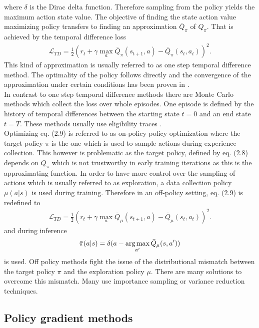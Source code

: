 where $\delta$ is the Dirac delta function. Therefore sampling from the policy yields the maximum action state value. The objective of finding the state action value maximizing policy transfers to finding an approximation $\bar{Q}_{\pi}$ of $Q_{\pi}$. That is achieved by the temporal difference loss
\begin{align}
\mathcal{L}_{TD} = \frac{1}{2} \left(r_{t} + \gamma \max_{a}\bar{Q}_{\pi}(s_{t+1}, a) - \bar{Q}_{\pi}(s_t, a_t)\right)^2.
\end{align}
This kind of approximation is usually referred to as one step temporal difference method. The optimality of the policy follows directly and the convergence of the approximation under certain conditions has been proven in \cite{SBQL}.\\
In contrast to one step temporal difference methods there are Monte Carlo methods which collect the loss over whole episodes. One episode is defined by the history of temporal differences between the starting state $t=0$ and an end state $t=T$. These methods usually use eligibility traces \cite{SBeligibility}. \\
Optimizing eq. (2.9) is referred to as on-policy policy optimization where the target policy $\pi$ is the one which is used to sample actions during experience collection. This however is problematic as the target policy, defined by eq. (2.8) depends on $Q_{\pi}$ which is not trustworthy in early training iterations as this is the approximating function. In order to have more control over the sampling of actions which is usually referred to as exploration, a data collection policy $\mu(a|s)$ is used during training. Therefore in an off-policy setting, eq. (2.9) is redefined to
\begin{align}
\mathcal{L}_{TD} = \frac{1}{2} \left(r_{t} + \gamma \max_{a}\bar{Q}_{\mu}(s_{t+1}, a) - \bar{Q}_{\mu}(s_t, a_t)\right)^2\text{.}
\end{align}
and during inference 
\begin{align}
\bar{\pi}(a|s) = \delta(a - \operatorname*{arg\,max}_{a'}\bar{Q}_{\mu}(s, a'))
\end{align}
is used. Off policy methods fight the issue of the distributional mismatch between the target policy $\pi$ and the exploration policy $\mu$. There are many solutions to overcome this mismatch. Many use importance sampling or variance reduction techniques.\cite{liu2018breaking}

\subsection{Policy gradient methods}

